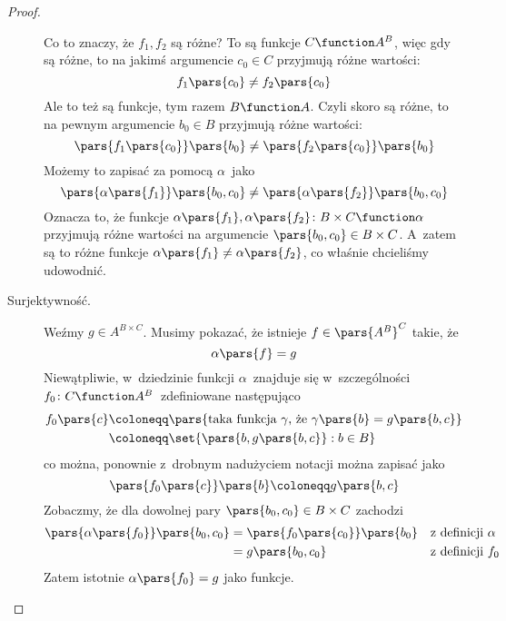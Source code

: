 \begin{proof}
\begin{description}
		      Co to znaczy, że \(f_1, f_2\) są różne? To są funkcje \(C \function A^B\), więc gdy są różne, to na jakimś argumencie \(c_0 \in C\) przyjmują różne wartości:
		      \begin{equation*}
			      f_1\pars{c_0} \neq f_2\pars{c_0}
		      \end{equation*}
		      Ale to też są funkcje, tym razem \(B \function A\). Czyli skoro są różne, to na pewnym argumencie \(b_0 \in B\) przyjmują różne wartości:
		      \begin{equation*}
			      \pars{f_1\pars{c_0}}\pars{b_0} \neq \pars{f_2\pars{c_0}}\pars{b_0}
		      \end{equation*}
		      Możemy to zapisać za pomocą \(\alpha\)~jako
		      \begin{equation*}
			      \pars{\alpha\pars{f_1}}\pars{b_0, c_0} \neq \pars{\alpha\pars{f_2}}\pars{b_0, c_0}
		      \end{equation*}
		      Oznacza to, że funkcje \(\alpha\pars{f_1}, \alpha\pars{f_2}\colon B \times C \function \alpha\) przyjmują różne wartości na argumencie \(\pars{b_0, c_0} \in B \times C\). A~zatem są to różne funkcje \(\alpha\pars{f_1} \neq \alpha\pars{f_2}\), co właśnie chcieliśmy udowodnić.
		\item[Surjektywność.] Weźmy \(g \in A^{B \times C}\). Musimy pokazać, że istnieje \(f \in \pars{A^B}^C\) takie, że
		      \begin{equation*}
			      \alpha\pars{f} = g
		      \end{equation*}
		      Niewątpliwie, w~dziedzinie funkcji \(\alpha\)~znajduje się w~szczególności \(f_0\colon C \function A^B\)~zdefiniowane następująco
		      \begin{equation*}
			      \begin{split}
				      f_0\pars{c}
				       & \coloneqq \pars{\text{taka funkcja \(\gamma\), że \(\gamma\pars{b} = g\pars{b, c}\)}} \\
				       & \coloneqq \set{\pars{b, g\pars{b, c}} : b \in B}
			      \end{split}
		      \end{equation*}
		      co można, ponownie z~drobnym nadużyciem notacji można zapisać jako
		      \begin{equation*}
			      \pars{f_0\pars{c}}\pars{b} \coloneqq g\pars{b, c}
		      \end{equation*}
		      Zobaczmy, że dla dowolnej pary \(\pars{b_0, c_0} \in B \times C\) zachodzi
		      \begin{align*}
			      \pars{\alpha\pars{f_0}}\pars{b_0, c_0}
			       & = \pars{f_0\pars{c_0}}\pars{b_0} &  & \text{z~definicji \(\alpha\)} \\
			       & = g\pars{b_0, c_0}               &  & \text{z~definicji \(f_0\)}
		      \end{align*}
		      Zatem istotnie \(\alpha\pars{f_0} = g\) jako funkcje.
	\end{description}
\end{proof}